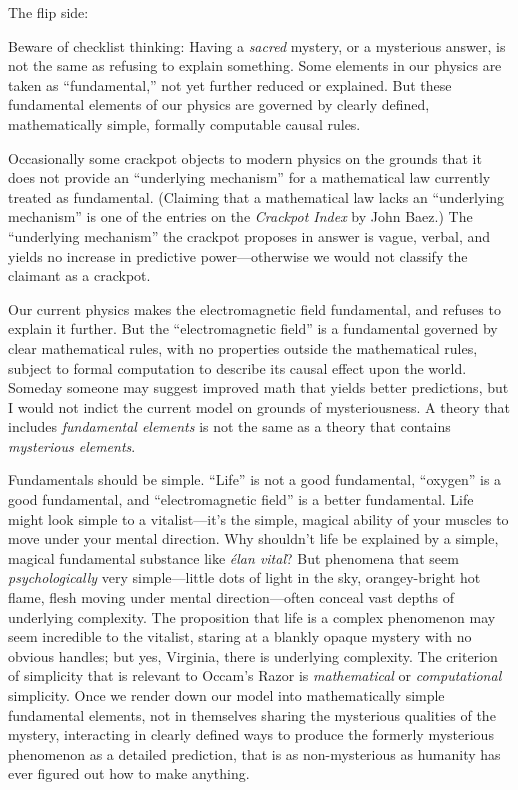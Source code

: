 {
 The flip side:}

{
 Beware of checklist thinking: Having a \textit{sacred} mystery, or
a mysterious answer, is not the same as refusing to explain something.
Some elements in our physics are taken as
``fundamental,'' not yet further
reduced or explained. But these fundamental elements of our physics are
governed by clearly defined, mathematically simple, formally computable
causal rules.}

{
 Occasionally some crackpot objects to modern physics on the
grounds that it does not provide an ``underlying
mechanism'' for a mathematical law currently treated
as fundamental. (Claiming that a mathematical law lacks an
``underlying mechanism'' is one of
the entries on the \textit{Crackpot Index} by John
Baez.) The ``underlying
mechanism'' the crackpot proposes in answer is vague,
verbal, and yields no increase in predictive power---otherwise we would
not classify the claimant as a crackpot.}

{
 Our current physics makes the electromagnetic field fundamental,
and refuses to explain it further. But the
``electromagnetic field'' is a
fundamental governed by clear mathematical rules, with no properties
outside the mathematical rules, subject to formal computation to
describe its causal effect upon the world. Someday someone may suggest
improved math that yields better predictions, but I would not indict
the current model on grounds of mysteriousness. A theory that includes
\textit{fundamental elements} is not the same as a theory that contains
\textit{mysterious elements}.}

{
 Fundamentals should be simple.
``Life'' is not a good fundamental,
``oxygen'' is a good fundamental,
and ``electromagnetic field'' is a
better fundamental. Life might look simple to a
vitalist---it's the simple, magical ability of your
muscles to move under your mental direction. Why
shouldn't life be explained by a simple, magical
fundamental substance like \textit{élan vital}? But phenomena that seem
\textit{psychologically} very simple---little dots of light in the sky,
orangey-bright hot flame, flesh moving under mental direction---often
conceal vast depths of underlying complexity. The proposition that life
is a complex phenomenon may seem incredible to the vitalist, staring at
a blankly opaque mystery with no obvious handles; but yes, Virginia,
there is underlying complexity. The criterion of simplicity that is
relevant to Occam's Razor is \textit{mathematical} or
\textit{computational} simplicity. Once we render down our model into
mathematically simple fundamental elements, not in themselves sharing
the mysterious qualities of the mystery, interacting in clearly defined
ways to produce the formerly mysterious phenomenon as a detailed
prediction, that is as non-mysterious as humanity has ever figured out
how to make anything.}

